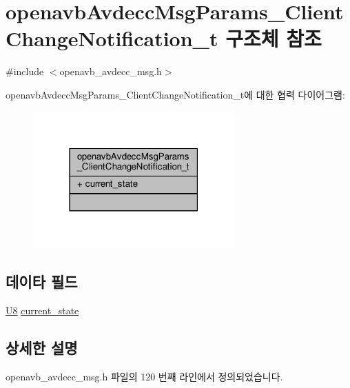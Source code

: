 \hypertarget{structopenavb_avdecc_msg_params___client_change_notification__t}{}\section{openavb\+Avdecc\+Msg\+Params\+\_\+\+Client\+Change\+Notification\+\_\+t 구조체 참조}
\label{structopenavb_avdecc_msg_params___client_change_notification__t}


{\ttfamily \#include $<$openavb\+\_\+avdecc\+\_\+msg.\+h$>$}



openavb\+Avdecc\+Msg\+Params\+\_\+\+Client\+Change\+Notification\+\_\+t에 대한 협력 다이어그램\+:
\nopagebreak
\begin{figure}[H]
\begin{center}
\leavevmode
\includegraphics[width=219pt]{structopenavb_avdecc_msg_params___client_change_notification__t__coll__graph}
\end{center}
\end{figure}
\subsection*{데이타 필드}
\begin{DoxyCompactItemize}
\item 
\hyperlink{openavb__types__base__pub_8h_aa63ef7b996d5487ce35a5a66601f3e73}{U8} \hyperlink{structopenavb_avdecc_msg_params___client_change_notification__t_ac89386877910da849a824021b5a3ee3a}{current\+\_\+state}
\end{DoxyCompactItemize}


\subsection{상세한 설명}


openavb\+\_\+avdecc\+\_\+msg.\+h 파일의 120 번째 라인에서 정의되었습니다.



